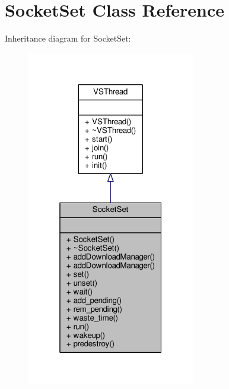 \hypertarget{classSocketSet}{}\section{Socket\+Set Class Reference}
\label{classSocketSet}


Inheritance diagram for Socket\+Set\+:
\nopagebreak
\begin{figure}[H]
\begin{center}
\leavevmode
\includegraphics[width=208pt]{dd/d73/classSocketSet__inherit__graph}
\end{center}
\end{figure}


